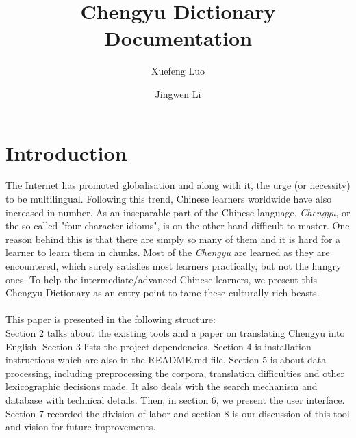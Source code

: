 \documentclass[11pt]{article} %
\title{Chengyu Dictionary Documentation} %
\author{Xuefeng Luo \and Jingwen Li}
\date{} %
\begin{document}
\maketitle
\setcounter{tocdepth}{1}
\tableofcontents
\listoffigures
\listoftables

\section{Introduction}
\indent The Internet has promoted globalisation and along with it, the urge (or necessity) to be multilingual. Following this trend, Chinese learners worldwide have also increased in number. As an inseparable part of the Chinese language, \textit{Chengyu}, or the so-called "four-character idioms", is on the other hand difficult to master. One reason behind this is that there are simply so many of them and it is hard for a learner to learn them in chunks. Most of the \textit{Chengyu} are learned as they are encountered, which surely satisfies most learners practically, but not the hungry ones. To help the intermediate/advanced Chinese learners, we present this Chengyu Dictionary as an entry-point to tame these culturally rich beasts.\\
\\
\indent This paper is presented in the following structure:\\
Section 2 talks about the existing tools and a paper on translating Chengyu into English. Section 3 lists the project dependencies. Section 4 is installation instructions which are also in the README.md file, Section 5 is about data processing, including preprocessing the corpora, translation difficulties and other lexicographic decisions made. It also deals with the search mechanism and database with technical details. Then, in section 6, we present the user interface. Section 7 recorded the division of labor and section 8 is our discussion of this tool and vision for future improvements.
\end{document}
